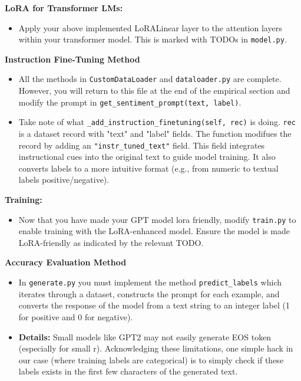 \documentclass[11pt,addpoints,answers]{exam}
\begin{document}
\begin{questions}
\textbf{LoRA for Transformer LMs:}
\begin{itemize}
    \item Apply your above implemented LoRALinear layer to the attention layers within your transformer model. This is marked with TODOs in \lstinline{model.py}. 
\end{itemize}

\textbf{Instruction Fine-Tuning Method}
\begin{itemize}
\item All the methods in \lstinline{CustomDataLoader} and \lstinline{dataloader.py} are complete. However, you will return to this file at the end of the empirical section and modify the prompt in \lstinline{get_sentiment_prompt(text, label)}. 
\item Take note of what \lstinline{_add_instruction_finetuning(self, rec)} is doing. \lstinline{rec} is a dataset record with "text" and "label" fields. The function modifues the record by adding an \lstinline{"instr_tuned_text"} field. This field integrates instructional cues into the original text to guide model training. It also converts labels to a more intuitive format (e.g., from numeric to textual labels positive/negative).
\end{itemize}

\textbf{Training:}
\begin{itemize}
    \item Now that you have made your GPT model lora friendly, modify \lstinline{train.py} to enable training with the LoRA-enhanced model. Ensure the model is made LoRA-friendly as indicated by the relevant TODO.
\end{itemize}


\textbf{Accuracy Evaluation Method}

\begin{itemize}
\item In \lstinline{generate.py} you must implement the method \lstinline{predict_labels} which iterates through a dataset, constructs the prompt for each example, and converts the response of the model from a text string to an integer label (1 for positive and 0 for negative).

\item \textbf{Details:} Small models like GPT2 may not easily generate EOS token (especially for small r). Acknowledging these limitations, one simple hack in our case (where training labels are categorical) is to simply check if these labels exists in the first few characters of the generated text. 


\end{itemize}
\end{questions}
\end{document}
